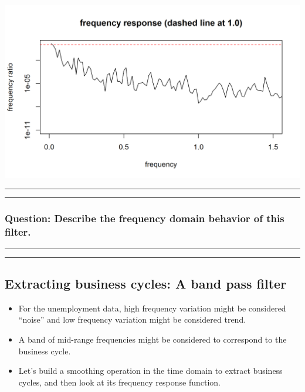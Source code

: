 \documentclass[]{article}
\begin{document}
\begin{center}\includegraphics{figure/intro-loess_transfer-1} \end{center}

\begin{center}\rule{0.5\linewidth}{\linethickness}\end{center}

\begin{center}\rule{0.5\linewidth}{\linethickness}\end{center}

\subsubsection{Question: Describe the frequency domain behavior of this
filter.}\label{question-describe-the-frequency-domain-behavior-of-this-filter.}

\begin{center}\rule{0.5\linewidth}{\linethickness}\end{center}

\begin{center}\rule{0.5\linewidth}{\linethickness}\end{center}

\subsection{Extracting business cycles: A band pass
filter}\label{extracting-business-cycles-a-band-pass-filter}

\begin{itemize}
\item
  For the unemployment data, high frequency variation might be
  considered ``noise'' and low frequency variation might be considered
  trend.
\item
  A band of mid-range frequencies might be considered to correspond to
  the business cycle.
\item
  Let's build a smoothing operation in the time domain to extract
  business cycles, and then look at its frequency response function.
\end{itemize}
\end{document}
